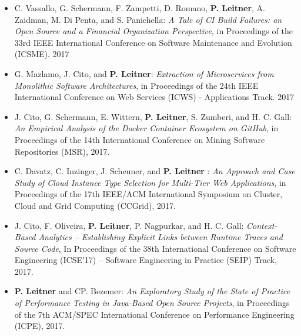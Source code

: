 \documentclass[paper=letter,fontsize=11pt]{scrartcl} %
\begin{document}
\begin{itemize}
	\item C. Vassallo, G. Schermann, F. Zampetti, D. Romano, \textbf{P. Leitner}, A. Zaidman, M. Di Penta, and S. Panichella: \emph{A Tale of CI Build Failures: an Open Source and a Financial Organization Perspective}, in Proceedings of the 33rd IEEE International Conference on Software Maintenance and Evolution (ICSME). 2017
	\item G. Mazlamo, J. Cito, and \textbf{P. Leitner}: \emph{Extraction of Microservices from Monolithic Software Architectures}, in Proceedings of the 24th IEEE International Conference on Web Services (ICWS) - Applications Track. 2017
	\item J. Cito, G. Schermann, E. Wittern, \textbf{P. Leitner}, S. Zumberi, and H. C. Gall: \emph{An Empirical Analysis of the Docker Container Ecosystem on GitHub}, in Proceedings of the 14th International Conference on Mining Software Repositories (MSR), 2017.
	\item C. Davatz, C. Inzinger, J. Scheuner, and \textbf{P. Leitner} : \emph{An Approach and Case Study of Cloud Instance Type Selection for Multi-Tier Web Applications}, in Proceedings of the 17th IEEE/ACM International Symposium on Cluster, Cloud and Grid Computing (CCGrid), 2017.
	\item J. Cito, F. Oliveira, \textbf{P. Leitner}, P. Nagpurkar, and H. C. Gall: \emph{Context-Based Analytics – Establishing Explicit Links between Runtime Traces and Source Code}, In Proceedings of the 38th International Conference on Software Engineering (ICSE'17) -- Software Engineering in Practice (SEIP) Track, 2017.
        \item \textbf{P. Leitner} and CP. Bezemer: \emph{An Exploratory Study of the State of Practice of Performance Testing in Java-Based Open Source Projects}, in  Proceedings of the 7th ACM/SPEC International Conference on Performance Engineering (ICPE), 2017.
\end{itemize}
\end{document}
